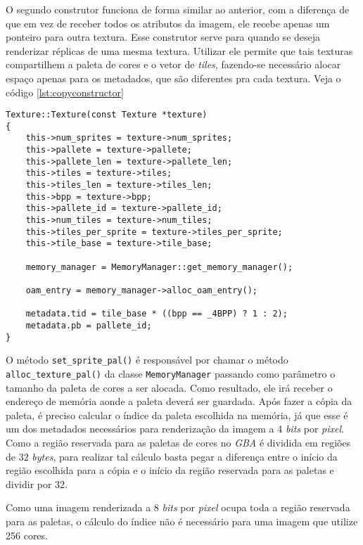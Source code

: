 O segundo construtor funciona de forma similar ao anterior, com a diferença de que em vez de receber todos os atributos da imagem, ele recebe apenas um ponteiro para outra textura. Esse construtor serve para quando se deseja renderizar réplicas de uma mesma textura. Utilizar ele permite que tais texturas compartilhem a paleta de cores e o vetor de \textit{tiles}, fazendo-se necessário alocar espaço apenas para os metadados, que são diferentes pra cada textura. Veja o código \ref{lst:copyconstructor}

\begin{lstlisting}[float,caption={Construtor por cópia da classe \texttt{Texture}.},label={lst:copyconstructor}]
Texture::Texture(const Texture *texture)
{
    this->num_sprites = texture->num_sprites;
    this->pallete = texture->pallete;
    this->pallete_len = texture->pallete_len;
    this->tiles = texture->tiles;
    this->tiles_len = texture->tiles_len;
    this->bpp = texture->bpp;
    this->pallete_id = texture->pallete_id;
    this->num_tiles = texture->num_tiles;
    this->tiles_per_sprite = texture->tiles_per_sprite;
    this->tile_base = texture->tile_base;

    memory_manager = MemoryManager::get_memory_manager();

    oam_entry = memory_manager->alloc_oam_entry();

    metadata.tid = tile_base * ((bpp == _4BPP) ? 1 : 2);
    metadata.pb = pallete_id;
}
\end{lstlisting}

\begin{sloppypar}
O método \texttt{set\_sprite\_pal()} é responsável por chamar o método \texttt{alloc\_texture\_pal()} da classe \texttt{MemoryManager} passando como parâmetro o tamanho da paleta de cores a ser alocada. Como resultado, ele irá receber o endereço de memória aonde a paleta deverá ser guardada. Após fazer a cópia da paleta, é preciso calcular o índice da paleta escolhida na memória, já que esse é um dos metadados necessários para renderização da imagem a 4 \textit{bits} por \textit{pixel}. Como a região reservada para as paletas de cores no \textit{GBA} é dividida em regiões de 32 \textit{bytes}, para realizar tal cálculo basta pegar a diferença entre o início da região escolhida para a cópia e o início da região reservada para as paletas e dividir por 32.
\end{sloppypar}

Como uma imagem renderizada a 8 \textit{bits} por \textit{pixel} ocupa toda a região reservada para as paletas, o cálculo do índice não é necessário para uma imagem que utilize 256 cores.

